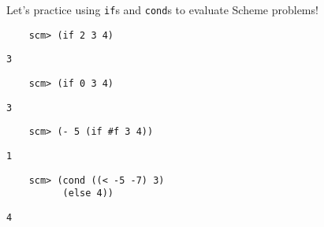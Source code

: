 \begin{blocksection}
Let's practice using \lstinline{if}s and \lstinline{cond}s to evaluate Scheme problems!

\begin{lstlisting}
    scm> (if 2 3 4)
\end{lstlisting}
\begin{solution}[.25in]
    \texttt{3}
\end{solution}

\begin{lstlisting}
    scm> (if 0 3 4)
\end{lstlisting}
\begin{solution}[.25in]
    \texttt{3}
\end{solution}

\begin{lstlisting}
    scm> (- 5 (if #f 3 4))
\end{lstlisting}
\begin{solution}[.25in]
    \texttt{1}
\end{solution}

\begin{lstlisting}
    scm> (cond ((< -5 -7) 3)
          (else 4))
\end{lstlisting}
\begin{solution}[.25in]
    \texttt{4}
\end{solution}
\end{blocksection}